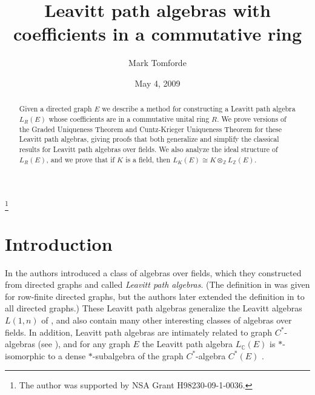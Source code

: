 \documentclass[11pt]{amsart}
\theoremstyle{remark}
\numberwithin{equation}{section}
\newcommand{\Z}{\mathbb{Z}}
\newcommand{\C}{\mathbb{C}}
\begin{document}
\title{Leavitt path algebras with coefficients in a commutative ring}


\author{Mark Tomforde}


\address{Department of Mathematics \\ University of Houston \\ Houston, TX 77204-3008 \\USA}


\thanks{The author was supported by NSA Grant H98230-09-1-0036.}

\date{May 4, 2009}






\begin{abstract}
Given a directed graph $E$ we describe a method for constructing a Leavitt path algebra $L_R(E)$ whose coefficients are in a commutative unital ring $R$.  We prove versions of the Graded Uniqueness Theorem and Cuntz-Krieger Uniqueness Theorem for these Leavitt path algebras, giving proofs that both generalize and simplify the classical results for Leavitt path algebras over fields.  We also analyze the ideal structure of $L_R(E)$, and we prove that if $K$ is a field, then $L_K(E) \cong K \otimes_\Z L_\Z(E)$. 
\end{abstract}

\maketitle

\section{Introduction}

In \cite{AbrPino} the authors introduced a class of algebras over fields, which they constructed from directed graphs and called \emph{Leavitt path algebras}.  (The definition in \cite{AbrPino} was given for row-finite directed graphs, but the authors later extended the definition in \cite{AbrPino3} to all directed graphs.)  These Leavitt path algebras generalize the Leavitt algebras $L(1,n)$ of \cite{Leav2}, and also contain many other interesting classes of algebras over fields.  In addition, Leavitt path algebras are intimately related to graph $C^*$-algebras (see \cite{Rae}), and for any graph $E$ the Leavitt path algebra $L_\C(E)$ is $*$-isomorphic to a dense $*$-subalgebra of the graph $C^*$-algebra $C^*(E)$ \cite[Theorem~7.3]{Tom10}.
\end{document}
